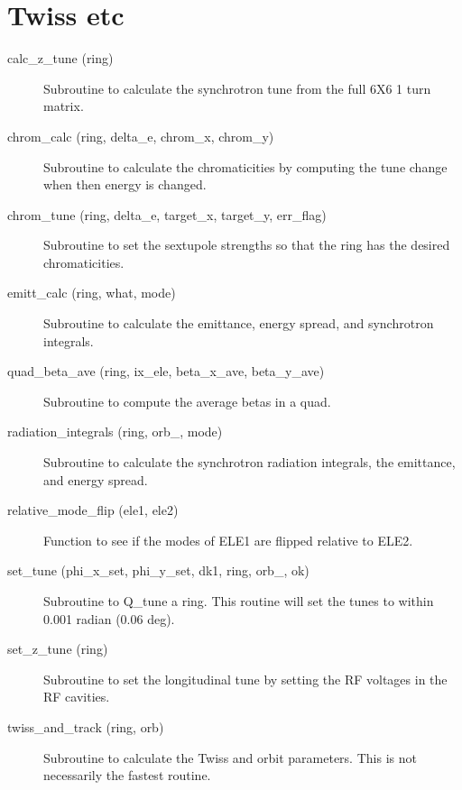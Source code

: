 \section{Twiss etc}
\label{r:twiss}

\begin{description}

\item[calc\_z\_tune (ring)] \Newline
Subroutine to calculate the synchrotron tune from the full 6X6 1 turn matrix. 

\item[chrom\_calc (ring, delta\_e, chrom\_x, chrom\_y)] \Newline
Subroutine to calculate the chromaticities by computing the tune 
change when then energy is changed. 

\item[chrom\_tune (ring, delta\_e, target\_x, target\_y, err\_flag)] \Newline
Subroutine to set the sextupole strengths so that the ring 
has the desired chromaticities. 

\item[emitt\_calc (ring, what, mode)] \Newline
Subroutine to calculate the emittance, energy spread, and synchrotron integrals. 

\item[quad\_beta\_ave (ring, ix\_ele, beta\_x\_ave, beta\_y\_ave)] \Newline
Subroutine to compute the average betas in a quad.

\item[radiation\_integrals (ring, orb\_, mode)] \Newline
Subroutine to calculate the synchrotron radiation integrals, the emittance, and energy spread. 

\item[relative\_mode\_flip (ele1, ele2)] \Newline
Function to see if the modes of ELE1 are flipped relative to ELE2. 

\item[set\_tune (phi\_x\_set, phi\_y\_set, dk1, ring, orb\_, ok)] \Newline
Subroutine to Q\_tune a ring. This routine will set the tunes to within 0.001 radian (0.06 deg). 

\item[set\_z\_tune (ring)] \Newline
Subroutine to set the longitudinal tune by setting the RF voltages in the RF cavities. 

\item[twiss\_and\_track (ring, orb)] \Newline
Subroutine to calculate the Twiss and orbit parameters. 
This is not necessarily the fastest routine. 


\end{description}
